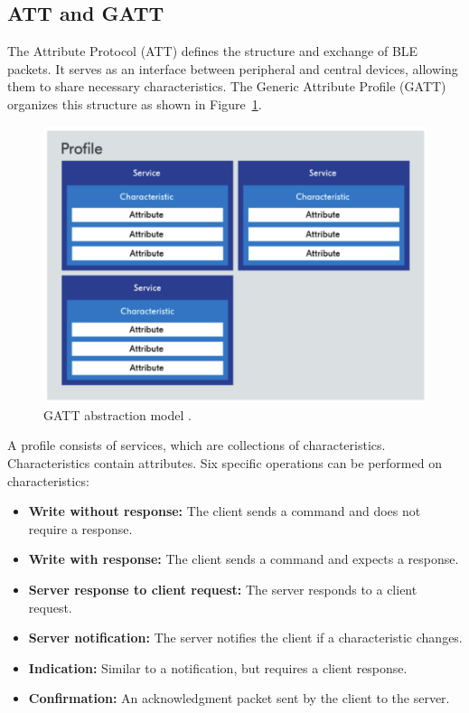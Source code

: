 \documentclass{Configuration_Files/PoliMi3i_thesis}
\begin{document}
\subsection{ATT and GATT}
The Attribute Protocol (ATT) defines the structure and exchange of BLE packets. It serves as an interface between peripheral and central devices, allowing them to share necessary characteristics. The Generic Attribute Profile (GATT) organizes this structure as shown in Figure~\ref{fig:gatt_model}. 

\begin{figure}[h]
    \centering
    \includegraphics[width=\linewidth]{Bluetooth Low Energy/Screenshot 2024-08-15 at 23.26.01.png}
    \caption{GATT abstraction model \cite{nordic_gatt}.}
    \label{fig:gatt_model}
\end{figure}

A profile consists of services, which are collections of characteristics. Characteristics contain attributes. Six specific operations can be performed on characteristics:
\begin{itemize}
    \item \textbf{Write without response:} The client sends a command and does not require a response.
    \item \textbf{Write with response:} The client sends a command and expects a response.
    \item \textbf{Server response to client request:} The server responds to a client request.
    \item \textbf{Server notification:} The server notifies the client if a characteristic changes.
    \item \textbf{Indication:} Similar to a notification, but requires a client response.
    \item \textbf{Confirmation:} An acknowledgment packet sent by the client to the server.
\end{itemize}
\end{document}
